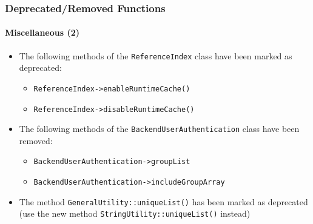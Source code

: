 %

\begin{frame}[fragile]
	\frametitle{Deprecated/Removed Functions}
	\framesubtitle{Miscellaneous (2)}

	\begin{itemize}
		\item The following methods of the \texttt{ReferenceIndex} class have been marked as deprecated:
			\begin{itemize}\small
				\item \texttt{ReferenceIndex->enableRuntimeCache()}
				\item \texttt{ReferenceIndex->disableRuntimeCache()}
			\end{itemize}\normalsize

		\item The following methods of the \texttt{BackendUserAuthentication} class have been removed:
			\begin{itemize}\small
				\item \texttt{BackendUserAuthentication->groupList}
				\item \texttt{BackendUserAuthentication->includeGroupArray}
			\end{itemize}\normalsize

		\item The method \texttt{GeneralUtility::uniqueList()} has been marked as deprecated\newline
			\small(use the new method \texttt{StringUtility::uniqueList()} instead)\normalsize

	\end{itemize}

\end{frame}

